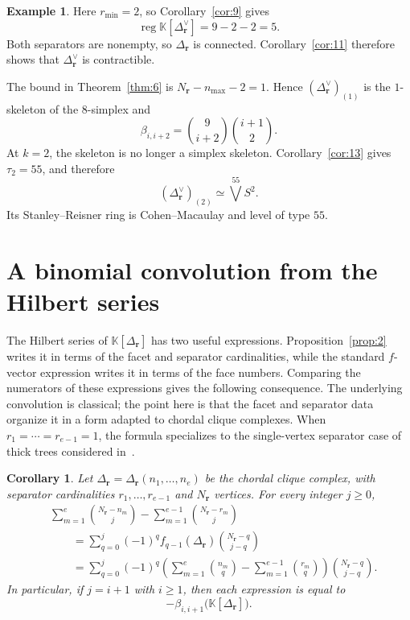\documentclass[11pt]{amsart}
\newtheorem{corollary}[theorem]{Corollary}
\theoremstyle{definition}
\newtheorem{example}[theorem]{Example}
\theoremstyle{remark}
\newcommand{\K}{\mathbb K}
\newcommand{\SR}[1]{\K[#1]}
\DeclareMathOperator{\reg}{reg}
\begin{document}
\begin{example}
		Here $r_{\min}=2$, so Corollary~\ref{cor:9} gives
		\[
		\reg\SR{\Delta_{\mathbf r}^\vee}=9-2-2=5.
		\]
		Both separators are nonempty, so $\Delta_{\mathbf r}$ is connected. Corollary~\ref{cor:11} therefore shows that $\Delta_{\mathbf r}^\vee$ is contractible.
		
		The bound in Theorem~\ref{thm:6} is $N_{\mathbf r}-n_{\max}-2=1$. Hence $(\Delta_{\mathbf r}^\vee)_{(1)}$ is the $1$-skeleton of the $8$-simplex and
		\[
		\beta_{i,i+2}=\binom9{i+2}\binom{i+1}2.
		\]
		At $k=2$, the skeleton is no longer a simplex skeleton. Corollary~\ref{cor:13} gives $\tau_2=55$, and therefore
		\[
		(\Delta_{\mathbf r}^\vee)_{(2)}\simeq\bigvee^{55}S^2.
		\]
		Its Stanley--Reisner ring is Cohen--Macaulay and level of type $55$.
	\end{example}
	
	\section{A binomial convolution from the Hilbert series}\label{sec:8}
	
	The Hilbert series of $\SR{\Delta_{\mathbf r}}$ has two useful expressions. Proposition~\ref{prop:2} writes it in terms of the facet and separator cardinalities, while the standard $f$-vector expression writes it in terms of the face numbers. Comparing the numerators of these expressions gives the following consequence. The underlying convolution is classical; the point here is that the facet and separator data organize it in a form adapted to chordal clique complexes. When $r_1=\cdots=r_{e-1}=1$, the formula specializes to the single-vertex separator case of thick trees considered in~\cite{Fr2}.
	
	\begin{corollary}\label{cor:18}
		Let $\Delta_{\mathbf r}=\Delta_{\mathbf r}(n_1,\ldots,n_e)$ be the chordal clique complex, with separator cardinalities $r_1,\ldots,r_{e-1}$ and $N_{\mathbf r}$ vertices. For every integer $j\geq0$,
		\begin{align*}
			&\sum_{m=1}^{e}\binom{N_{\mathbf r}-n_m}{j}
			-\sum_{m=1}^{e-1}\binom{N_{\mathbf r}-r_m}{j} \\
			&\qquad=
			\sum_{q=0}^{j}(-1)^q f_{q-1}(\Delta_{\mathbf r})
			\binom{N_{\mathbf r}-q}{j-q} \\
			&\qquad=
			\sum_{q=0}^{j}(-1)^q
			\left(
			\sum_{m=1}^{e}\binom{n_m}{q}
			-\sum_{m=1}^{e-1}\binom{r_m}{q}
			\right)
			\binom{N_{\mathbf r}-q}{j-q}.
		\end{align*}
		In particular, if $j=i+1$ with $i\geq1$, then each expression is equal to
		\[
		-\beta_{i,i+1}\bigl(\SR{\Delta_{\mathbf r}}\bigr).
		\]
	\end{corollary}
	
\end{document}
